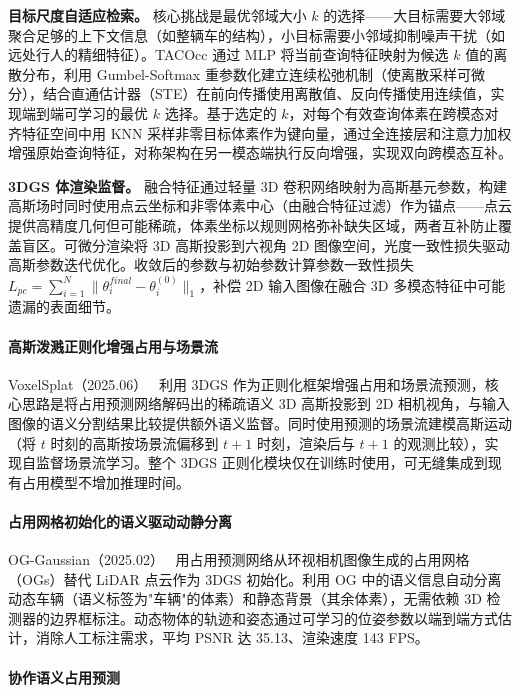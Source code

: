 \textbf{目标尺度自适应检索。} 核心挑战是最优邻域大小 $k$ 的选择——大目标需要大邻域聚合足够的上下文信息（如整辆车的结构），小目标需要小邻域抑制噪声干扰（如远处行人的精细特征）。TACOcc 通过 MLP 将当前查询特征映射为候选 $k$ 值的离散分布，利用 Gumbel-Softmax 重参数化建立连续松弛机制（使离散采样可微分），结合直通估计器（STE）在前向传播使用离散值、反向传播使用连续值，实现端到端可学习的最优 $k$ 选择。基于选定的 $k$，对每个有效查询体素在跨模态对齐特征空间中用 KNN 采样非零目标体素作为键向量，通过全连接层和注意力加权增强原始查询特征，对称架构在另一模态端执行反向增强，实现双向跨模态互补。

\textbf{3DGS 体渲染监督。} 融合特征通过轻量 3D 卷积网络映射为高斯基元参数，构建高斯场时同时使用点云坐标和非零体素中心（由融合特征过滤）作为锚点——点云提供高精度几何但可能稀疏，体素坐标以规则网格弥补缺失区域，两者互补防止覆盖盲区。可微分渲染将 3D 高斯投影到六视角 2D 图像空间，光度一致性损失驱动高斯参数迭代优化。收敛后的参数与初始参数计算参数一致性损失 $L_{pc} = \sum_{i=1}^N \|\theta_i^{final} - \theta_i^{(0)}\|_1$，补偿 2D 输入图像在融合 3D 多模态特征中可能遗漏的表面细节。

\paragraph{高斯泼溅正则化增强占用与场景流}

VoxelSplat（2025.06）~\cite{2506_05563} 利用 3DGS 作为正则化框架增强占用和场景流预测，核心思路是将占用预测网络解码出的稀疏语义 3D 高斯投影到 2D 相机视角，与输入图像的语义分割结果比较提供额外语义监督。同时使用预测的场景流建模高斯运动（将 $t$ 时刻的高斯按场景流偏移到 $t+1$ 时刻，渲染后与 $t+1$ 的观测比较），实现自监督场景流学习。整个 3DGS 正则化模块仅在训练时使用，可无缝集成到现有占用模型不增加推理时间。

\paragraph{占用网格初始化的语义驱动动静分离}

OG-Gaussian（2025.02）~\cite{2502_14235} 用占用预测网络从环视相机图像生成的占用网格（OGs）替代 LiDAR 点云作为 3DGS 初始化。利用 OG 中的语义信息自动分离动态车辆（语义标签为"车辆"的体素）和静态背景（其余体素），无需依赖 3D 检测器的边界框标注。动态物体的轨迹和姿态通过可学习的位姿参数以端到端方式估计，消除人工标注需求，平均 PSNR 达 35.13、渲染速度 143 FPS。

\paragraph{协作语义占用预测}

